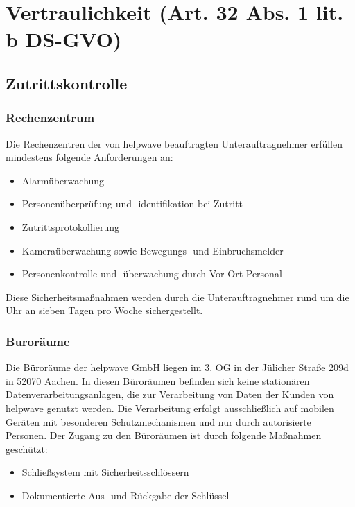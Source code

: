 \documentclass[10pt]{article}
\begin{document}
\section{Vertraulichkeit (Art. 32 Abs. 1 lit. b DS-GVO)}
\subsection{Zutrittskontrolle}
\subsubsection{Rechenzentrum}
Die Rechenzentren der von helpwave beauftragten Unterauftragnehmer erfüllen mindestens
folgende Anforderungen an:
\begin{itemize}
	\item Alarmüberwachung
	\item Personenüberprüfung und -identifikation bei Zutritt
	\item Zutrittsprotokollierung
	\item Kameraüberwachung sowie Bewegungs- und Einbruchsmelder
	\item Personenkontrolle und -überwachung durch Vor-Ort-Personal
\end{itemize}
Diese Sicherheitsmaßnahmen werden durch die Unterauftragnehmer rund um die Uhr an sieben Tagen pro Woche sichergestellt.

\subsubsection{Buroräume}
Die Büroräume der helpwave GmbH liegen im 3. OG in der Jülicher Straße 209d in 52070 Aachen. In diesen Büroräumen befinden sich keine stationären Datenverarbeitungsanlagen, die zur Verarbeitung von Daten der Kunden von helpwave genutzt werden. Die Verarbeitung
erfolgt ausschließlich auf mobilen Geräten mit besonderen Schutzmechanismen und nur
durch autorisierte Personen.
Der Zugang zu den Büroräumen ist durch folgende Maßnahmen geschützt:
\begin{itemize}
	\item Schließsystem mit Sicherheitsschlössern
	\item Dokumentierte Aus- und Rückgabe der Schlüssel
\end{itemize}
\end{document}
